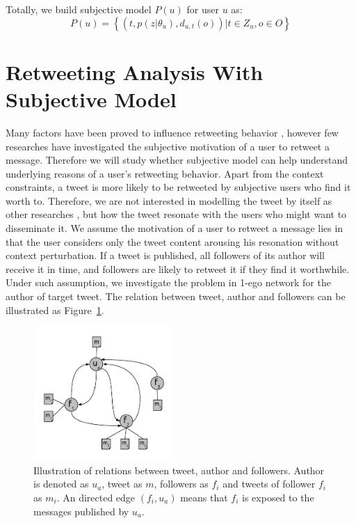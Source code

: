 \documentclass[letterpaper]{article}
\begin{document}
Totally, we build subjective model $ P\left( u \right) $ for user $ u $ as:
\begin{equation}
\label{subuser}
P\left( u \right)= \left\lbrace \left( t, p\left( z \vert \theta_{u} \right), d_{u,t}\left( o \right) \right)  \vert t \in Z_{u}, o \in O  \right\rbrace  
\end{equation}

\section{Retweeting Analysis With Subjective Model}

Many factors have been proved to influence retweeting behavior \cite{Suh2010,conf/icwsm/MacskassyM11,Comarela:2012UFA}, however few researches have investigated the subjective motivation of a user to retweet a message. 
Therefore we will study whether subjective model can help understand underlying reasons of a user's retweeting behavior.
Apart from the context constraints, a tweet is more likely to be retweeted by subjective users who find it worth to. 
Therefore, we are not interested in modelling the tweet by itself as other researches \cite{Naveed:2011SMC,2011:NaveedGKC,conf/icwsm/PfitznerGS12}, but how the tweet resonate with the users who might want to disseminate it. 
We assume the motivation of a user to retweet a message lies in that the user considers only the tweet content arousing his resonation without context perturbation. 
If a tweet is published, all followers of its author will receive it in time, and followers are likely to retweet it if they find it worthwhile. 
Under such assumption, we investigate the problem in 1-ego network for the author of target tweet. 
The relation between tweet, author and followers can be illustrated as Figure~\ref{fig1}.
\begin{figure}[htb]
\centering
\includegraphics[width=2.1in,height=2.0in]{ego.pdf}
\caption{Illustration of relations between tweet, author and followers. Author is denoted as $ u_{a} $, tweet as $ m $, followers as $ f_{i} $ and tweets of follower $ f_{i} $ as $ m_{i} $. An directed edge $ \left( f_{i},u_{a} \right)  $ means that $ f_{i} $ is exposed to the messages published by $ u_{a} $.}
\label{fig1}
\end{figure}
\end{document}
